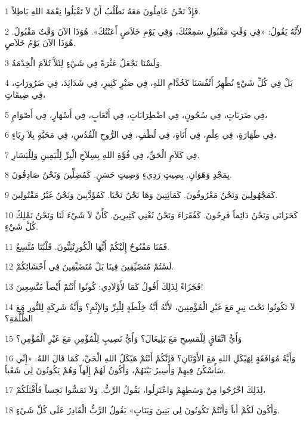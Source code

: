 \par 1 فَإِذْ نَحْنُ عَامِلُونَ مَعَهُ نَطْلُبُ أَنْ لاَ تَقْبَلُوا نِعْمَةَ اللهِ بَاطِلاً.
\par 2 لأَنَّهُ يَقُولُ: «فِي وَقْتٍ مَقْبُولٍ سَمِعْتُكَ، وَفِي يَوْمِ خَلاَصٍ أَعَنْتُكَ». هُوَذَا الآنَ وَقْتٌ مَقْبُولٌ. هُوَذَا الآنَ يَوْمُ خَلاَصٍ.
\par 3 وَلَسْنَا نَجْعَلُ عَثْرَةً فِي شَيْءٍ لِئَلاَّ تُلاَمَ الْخِدْمَةُ.
\par 4 بَلْ فِي كُلِّ شَيْءٍ نُظْهِرُ أَنْفُسَنَا كَخُدَّامِ اللهِ، فِي صَبْرٍ كَثِيرٍ، فِي شَدَائِدَ، فِي ضَرُورَاتٍ، فِي ضِيقَاتٍ،
\par 5 فِي ضَرَبَاتٍ، فِي سُجُونٍ، فِي اضْطِرَابَاتٍ، فِي أَتْعَابٍ، فِي أَسْهَارٍ، فِي أَصْوَامٍ،
\par 6 فِي طَهَارَةٍ، فِي عِلْمٍ، فِي أَنَاةٍ، فِي لُطْفٍ، فِي الرُّوحِ الْقُدُسِ، فِي مَحَبَّةٍ بِلاَ رِيَاءٍ،
\par 7 فِي كَلاَمِ الْحَقِّ، فِي قُوَّةِ اللهِ بِسِلاَحِ الْبِرِّ لِلْيَمِينِ وَلِلْيَسَارِ.
\par 8 بِمَجْدٍ وَهَوَانٍ. بِصِيتٍ رَدِيءٍ وَصِيتٍ حَسَنٍ. كَمُضِلِّينَ وَنَحْنُ صَادِقُونَ.
\par 9 كَمَجْهُولِينَ وَنَحْنُ مَعْرُوفُونَ. كَمَائِتِينَ وَهَا نَحْنُ نَحْيَا. كَمُؤَدَّبِينَ وَنَحْنُ غَيْرُ مَقْتُولِينَ.
\par 10 كَحَزَانَى وَنَحْنُ دَائِماً فَرِحُونَ. كَفُقَرَاءَ وَنَحْنُ نُغْنِي كَثِيرِينَ. كَأَنْ لاَ شَيْءَ لَنَا وَنَحْنُ نَمْلِكُ كُلَّ شَيْءٍ.
\par 11 فَمُنَا مَفْتُوحٌ إِلَيْكُمْ أَيُّهَا الْكُورِنْثِيُّونَ. قَلْبُنَا مُتَّسِعٌ.
\par 12 لَسْتُمْ مُتَضَيِّقِينَ فِينَا بَلْ مُتَضَيِّقِينَ فِي أَحْشَائِكُمْ.
\par 13 فَجَزَاءً لِذَلِكَ أَقُولُ كَمَا لأَوْلاَدِي: كُونُوا أَنْتُمْ أَيْضاً مُتَّسِعِينَ!
\par 14 لاَ تَكُونُوا تَحْتَ نِيرٍ مَعَ غَيْرِ الْمُؤْمِنِينَ، لأَنَّهُ أَيَّةُ خِلْطَةٍ لِلْبِرِّ وَالإِثْمِ؟ وَأَيَّةُ شَرِكَةٍ لِلنُّورِ مَعَ الظُّلْمَةِ؟
\par 15 وَأَيُّ اتِّفَاقٍ لِلْمَسِيحِ مَعَ بَلِيعَالَ؟ وَأَيُّ نَصِيبٍ لِلْمُؤْمِنِ مَعَ غَيْرِ الْمُؤْمِنِ؟
\par 16 وَأَيَّةُ مُوَافَقَةٍ لِهَيْكَلِ اللهِ مَعَ الأَوْثَانِ؟ فَإِنَّكُمْ أَنْتُمْ هَيْكَلُ اللهِ الْحَيِّ، كَمَا قَالَ اللهُ: «إِنِّي سَأَسْكُنُ فِيهِمْ وَأَسِيرُ بَيْنَهُمْ، وَأَكُونُ لَهُمْ إِلَهاً وَهُمْ يَكُونُونَ لِي شَعْباً.
\par 17 لِذَلِكَ اخْرُجُوا مِنْ وَسَطِهِمْ وَاعْتَزِلُوا، يَقُولُ الرَّبُّ. وَلاَ تَمَسُّوا نَجِساً فَأَقْبَلَكُمْ،
\par 18 وَأَكُونَ لَكُمْ أَباً وَأَنْتُمْ تَكُونُونَ لِي بَنِينَ وَبَنَاتٍ» يَقُولُ الرَّبُّ الْقَادِرُ عَلَى كُلِّ شَيْءٍ.

